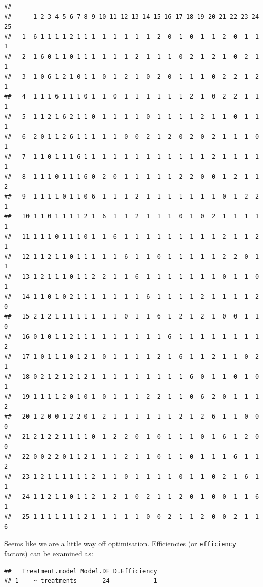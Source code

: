 \documentclass[
]{book}
\newenvironment{Shaded}{\begin{snugshade}}{\end{snugshade}}
\newcommand{\FloatTok}[1]{\textcolor[rgb]{0.00,0.00,0.81}{#1}}
\newcommand{\NormalTok}[1]{#1}
\newcommand{\SpecialCharTok}[1]{\textcolor[rgb]{0.00,0.00,0.00}{#1}}
\begin{document}
\begin{verbatim}
##     
##      1 2 3 4 5 6 7 8 9 10 11 12 13 14 15 16 17 18 19 20 21 22 23 24 25
##   1  6 1 1 1 1 2 1 1 1  1  1  1  1  1  2  0  1  0  1  1  2  0  1  1  1
##   2  1 6 0 1 1 0 1 1 1  1  1  1  2  1  1  1  0  2  1  2  1  0  2  1  1
##   3  1 0 6 1 2 1 0 1 1  0  1  2  1  0  2  0  1  1  1  0  2  2  1  2  1
##   4  1 1 1 6 1 1 1 0 1  1  0  1  1  1  1  1  1  2  1  0  2  2  1  1  1
##   5  1 1 2 1 6 2 1 1 0  1  1  1  1  0  1  1  1  1  2  1  1  0  1  1  1
##   6  2 0 1 1 2 6 1 1 1  1  1  0  0  2  1  2  0  2  0  2  1  1  1  0  1
##   7  1 1 0 1 1 1 6 1 1  1  1  1  1  1  1  1  1  1  1  2  1  1  1  1  1
##   8  1 1 1 0 1 1 1 6 0  2  0  1  1  1  1  1  2  2  0  0  1  2  1  1  2
##   9  1 1 1 1 0 1 1 0 6  1  1  1  2  1  1  1  1  1  1  1  0  1  2  2  1
##   10 1 1 0 1 1 1 1 2 1  6  1  1  2  1  1  1  0  1  0  2  1  1  1  1  1
##   11 1 1 1 0 1 1 1 0 1  1  6  1  1  1  1  1  1  1  1  1  2  1  1  2  1
##   12 1 1 2 1 1 0 1 1 1  1  1  6  1  1  0  1  1  1  1  1  2  2  0  1  1
##   13 1 2 1 1 1 0 1 1 2  2  1  1  6  1  1  1  1  1  1  1  0  1  1  0  1
##   14 1 1 0 1 0 2 1 1 1  1  1  1  1  6  1  1  1  1  2  1  1  1  1  2  0
##   15 2 1 2 1 1 1 1 1 1  1  1  0  1  1  6  1  2  1  2  1  0  0  1  1  0
##   16 0 1 0 1 1 2 1 1 1  1  1  1  1  1  1  6  1  1  1  1  1  1  1  1  2
##   17 1 0 1 1 1 0 1 2 1  0  1  1  1  1  2  1  6  1  1  2  1  1  0  2  1
##   18 0 2 1 2 1 2 1 2 1  1  1  1  1  1  1  1  1  6  0  1  1  0  1  0  1
##   19 1 1 1 1 2 0 1 0 1  0  1  1  1  2  2  1  1  0  6  2  0  1  1  1  2
##   20 1 2 0 0 1 2 2 0 1  2  1  1  1  1  1  1  2  1  2  6  1  1  0  0  0
##   21 2 1 2 2 1 1 1 1 0  1  2  2  0  1  0  1  1  1  0  1  6  1  2  0  0
##   22 0 0 2 2 0 1 1 2 1  1  1  2  1  1  0  1  1  0  1  1  1  6  1  1  2
##   23 1 2 1 1 1 1 1 1 2  1  1  0  1  1  1  1  0  1  1  0  2  1  6  1  1
##   24 1 1 2 1 1 0 1 1 2  1  2  1  0  2  1  1  2  0  1  0  0  1  1  6  1
##   25 1 1 1 1 1 1 1 2 1  1  1  1  1  0  0  2  1  1  2  0  0  2  1  1  6
\end{verbatim}

Seems like we are a little way off optimisation. Efficiencies (or \texttt{efficiency} factors) can be examined as:

\begin{Shaded}
\end{Shaded}

\begin{verbatim}
##   Treatment.model Model.DF D.Efficiency
## 1    ~ treatments       24            1
\end{verbatim}
\end{document}
